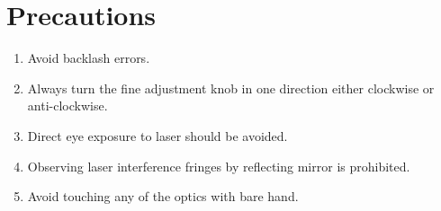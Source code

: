 \documentclass{article}
\begin{document}
\section{Precautions}
\begin{enumerate}
    \item Avoid backlash errors.
    \item Always turn the fine adjustment knob in one direction either clockwise or anti-clockwise.
    \item Direct eye exposure to laser should be avoided.
    \item Observing laser interference fringes by reflecting mirror is prohibited.
    \item Avoid touching any of the optics with bare hand.
\end{enumerate}
\end{document}
